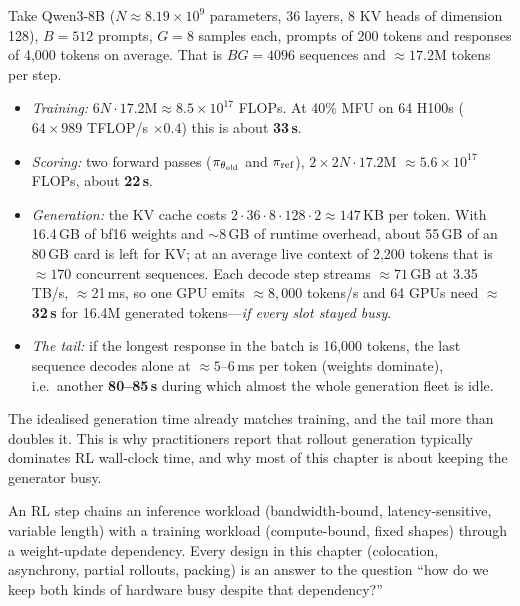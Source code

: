 \begin{napkinmath}
Take Qwen3-8B ($N\approx 8.19\times10^9$ parameters, 36 layers, 8 KV heads of dimension 128),
$B=512$ prompts, $G=8$ samples each, prompts of 200 tokens and responses of 4{,}000 tokens on
average. That is $BG = 4096$ sequences and $\approx 17.2$M tokens per step.
\begin{itemize}
\item \emph{Training:} $6N\cdot 17.2\text{M} \approx 8.5\times10^{17}$ FLOPs. At 40\% MFU on 64
H100s ($64 \times 989$ TFLOP/s $\times 0.4$) this is about \textbf{33\,s}.
\item \emph{Scoring:} two forward passes ($\pi_{\theta_{\text{old}}}$ and $\pi_{\text{ref}}$), $2\times 2N\cdot 17.2$M
$\approx 5.6\times10^{17}$ FLOPs, about \textbf{22\,s}.
\item \emph{Generation:} the KV cache costs $2\cdot 36\cdot 8\cdot 128\cdot 2 \approx 147$\,KB per
token. With 16.4\,GB of bf16 weights and $\sim$8\,GB of runtime overhead, about 55\,GB of an
80\,GB card is left for KV; at an average live context of 2{,}200 tokens that is $\approx 170$
concurrent sequences. Each decode step streams $\approx 71$\,GB at 3.35\,TB/s, $\approx$21\,ms,
so one GPU emits $\approx 8{,}000$ tokens/s and 64 GPUs need $\approx$\textbf{32\,s} for 16.4M
generated tokens---\emph{if every slot stayed busy}.
\item \emph{The tail:} if the longest response in the batch is 16{,}000 tokens, the last
sequence decodes alone at $\approx 5$--6\,ms per token (weights dominate), i.e.\ another
\textbf{80--85\,s} during which almost the whole generation fleet is idle.
\end{itemize}
The idealised generation time already matches training, and the tail more than doubles it.
This is why practitioners report that rollout generation typically dominates RL wall-clock
time, and why most of this chapter is about keeping the generator busy.
\end{napkinmath}

\begin{keyidea}
An RL step chains an inference workload (bandwidth-bound, latency-sensitive, variable length)
with a training workload (compute-bound, fixed shapes) through a weight-update dependency.
Every design in this chapter (colocation, asynchrony, partial rollouts, packing) is an
answer to the question ``how do we keep both kinds of hardware busy despite that dependency?''
\end{keyidea}

